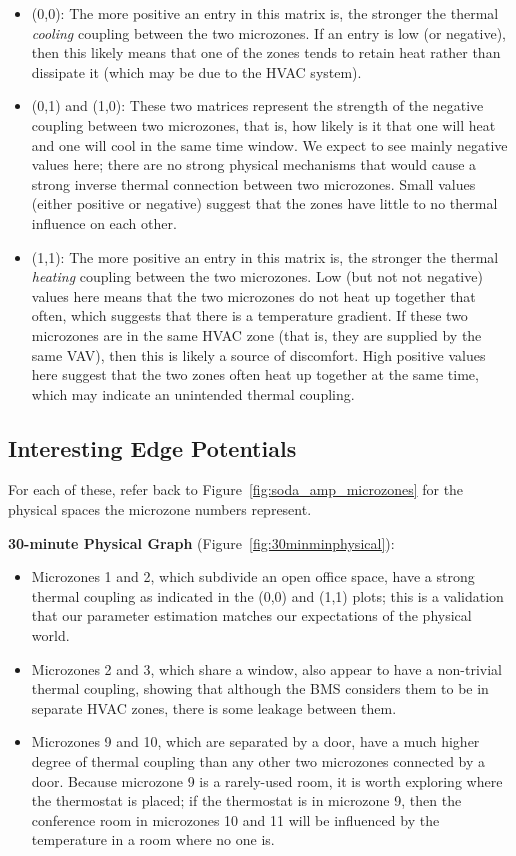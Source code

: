 \begin{itemize}[noitemsep,nolistsep]
\item (0,0): The more positive an entry in this matrix is, the stronger the thermal \emph{cooling} coupling between the two microzones.
If an entry is low (or negative), then this likely means that one of the zones tends to retain heat rather than dissipate it (which may be due to the HVAC system).
\item (0,1) and (1,0): These two matrices represent the strength of the negative coupling between two microzones, that is, how likely is it that one will heat and one will cool in the same time window.
We expect to see mainly negative values here; there are no strong physical mechanisms that would cause a strong inverse thermal connection between two microzones.
Small values (either positive or negative) suggest that the zones have little to no thermal influence on each other.
\item (1,1): The more positive an entry in this matrix is, the stronger the thermal \emph{heating} coupling between the two microzones.
Low (but not not negative) values here means that the two microzones do not heat up together that often, which suggests that there is a temperature gradient.
If these two microzones are in the same HVAC zone (that is, they are supplied by the same VAV), then this is likely a source of discomfort.
High positive values here suggest that the two zones often heat up together at the same time, which may indicate an unintended thermal coupling.
\end{itemize}

\subsection{Interesting Edge Potentials}

For each of these, refer back to Figure~\ref{fig:soda_amp_microzones} for the physical spaces the microzone numbers represent.

\textbf{30-minute Physical Graph} (Figure~\ref{fig:30minminphysical}):

\begin{itemize}[noitemsep,nolistsep]
\item Microzones 1 and 2, which subdivide an open office space, have a strong thermal coupling as indicated in the (0,0) and (1,1) plots; this is a validation that our parameter estimation matches our expectations of the physical world.
\item Microzones 2 and 3, which share a window, also appear to have a non-trivial thermal coupling, showing that although the BMS considers them to be in separate HVAC zones, there is some leakage between them.
\item Microzones 9 and 10, which are separated by a door, have a much higher degree of thermal coupling than any other two microzones connected by a door.
Because microzone 9 is a rarely-used room, it is worth exploring where the thermostat is placed; if the thermostat is in microzone 9, then the conference room in microzones 10 and 11 will be influenced by the temperature in a room where no one is.
\end{itemize}

